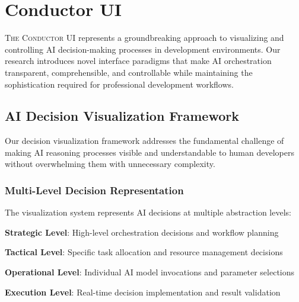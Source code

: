 
\section*{Conductor UI}

\lettrine{T}{he Conductor UI} represents a groundbreaking approach to visualizing and controlling AI decision-making processes in development environments. Our research introduces novel interface paradigms that make AI orchestration transparent, comprehensible, and controllable while maintaining the sophistication required for professional development workflows.

\subsection*{AI Decision Visualization Framework}

Our decision visualization framework addresses the fundamental challenge of making AI reasoning processes visible and understandable to human developers without overwhelming them with unnecessary complexity.

\subsubsection*{Multi-Level Decision Representation}

The visualization system represents AI decisions at multiple abstraction levels:

\begin{expandedlist}
    \item \textbf{Strategic Level}: High-level orchestration decisions and workflow planning
    \item \textbf{Tactical Level}: Specific task allocation and resource management decisions
    \item \textbf{Operational Level}: Individual AI model invocations and parameter selections
    \item \textbf{Execution Level}: Real-time decision implementation and result validation
\end{expandedlist}

